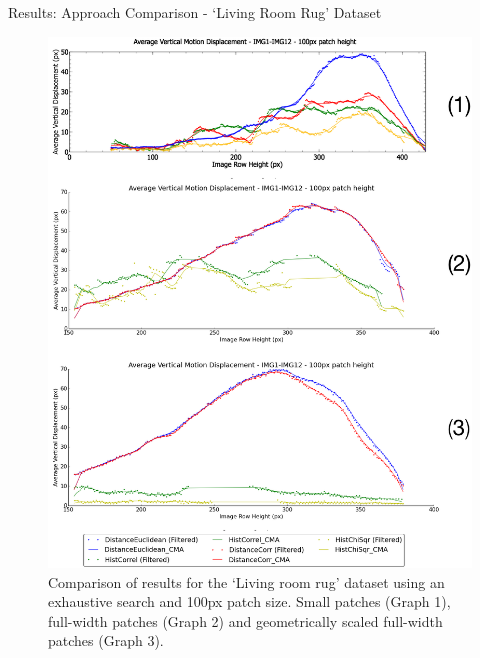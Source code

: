\documentclass[10pt, compress]{beamer}
\begin{document}
\begin{frame}{Results: Approach Comparison - `Living Room Rug' Dataset}

\begin{figure}[ht!]
\centering
\vspace{-0.5cm}
\includegraphics[scale=0.12]{flat_pres_results.png}
\caption{Comparison of results for the `Living room rug' dataset using an exhaustive search and 100px patch size. Small patches (Graph 1), full-width patches (Graph 2) and geometrically scaled full-width patches (Graph 3).}
\end{figure}

\end{frame}
\end{document}
